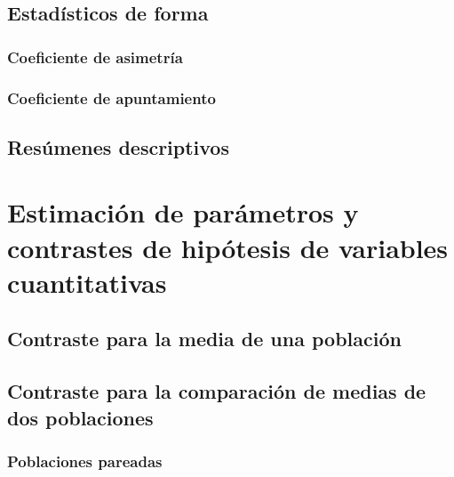 \documentclass[
]{book}
\theoremstyle{definition}
\theoremstyle{definition}
\theoremstyle{definition}
\theoremstyle{definition}
\theoremstyle{remark}
\begin{document}
\hypertarget{estaduxedsticos-de-forma}{%
\section{Estadísticos de forma}\label{estaduxedsticos-de-forma}}

\hypertarget{coeficiente-de-asimetruxeda}{%
\subsection{Coeficiente de asimetría}\label{coeficiente-de-asimetruxeda}}

\hypertarget{coeficiente-de-apuntamiento}{%
\subsection{Coeficiente de apuntamiento}\label{coeficiente-de-apuntamiento}}

\hypertarget{resuxfamenes-descriptivos}{%
\section{Resúmenes descriptivos}\label{resuxfamenes-descriptivos}}

\hypertarget{estimaciuxf3n-de-paruxe1metros-y-contrastes-de-hipuxf3tesis-de-variables-cuantitativas}{%
\chapter{Estimación de parámetros y contrastes de hipótesis de variables cuantitativas}\label{estimaciuxf3n-de-paruxe1metros-y-contrastes-de-hipuxf3tesis-de-variables-cuantitativas}}

\hypertarget{contraste-para-la-media-de-una-poblaciuxf3n}{%
\section{Contraste para la media de una población}\label{contraste-para-la-media-de-una-poblaciuxf3n}}

\hypertarget{contraste-para-la-comparaciuxf3n-de-medias-de-dos-poblaciones}{%
\section{Contraste para la comparación de medias de dos poblaciones}\label{contraste-para-la-comparaciuxf3n-de-medias-de-dos-poblaciones}}

\hypertarget{poblaciones-pareadas}{%
\subsection{Poblaciones pareadas}\label{poblaciones-pareadas}}
\end{document}
